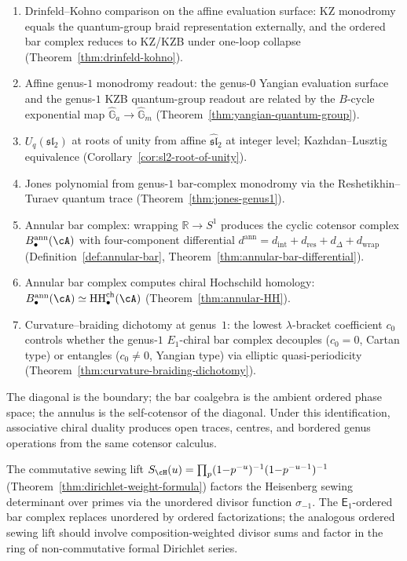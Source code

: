 \begin{enumerate}[label=(\arabic*)]
$B$-cycle monodromy of the KZB connection, with
$q = e^{\pi i\hbar}$
(Theorem~\ref{thm:b-cycle-quantum-group}).
\item Drinfeld--Kohno comparison on the affine evaluation surface: KZ
monodromy equals the quantum-group braid representation externally,
and the ordered bar complex reduces to KZ/KZB under one-loop collapse
(Theorem~\ref{thm:drinfeld-kohno}).
\item Affine genus-$1$ monodromy readout: the genus-$0$ Yangian
evaluation surface and the genus-$1$ KZB quantum-group readout are
related by the $B$-cycle exponential map
$\widehat{\mathbb{G}}_a \to \widehat{\mathbb{G}}_m$
(Theorem~\ref{thm:yangian-quantum-group}).
\item $U_q(\mathfrak{sl}_2)$ at roots of unity from affine
$\widehat{\mathfrak{sl}}_2$ at integer level; Kazhdan--Lusztig equivalence
(Corollary~\ref{cor:sl2-root-of-unity}).
\item Jones polynomial from genus-$1$ bar-complex monodromy via the
Reshetikhin--Turaev quantum trace
(Theorem~\ref{thm:jones-genus1}).
\item Annular bar complex: wrapping $\mathbb{R}\to S^1$ produces the
cyclic cotensor complex $B^{\mathrm{ann}}_\bullet(\cA)$ with four-component
differential $d^{\mathrm{ann}}=d_{\mathrm{int}}+d_{\mathrm{res}}+d_\Delta
+d_{\mathrm{wrap}}$ (Definition~\ref{def:annular-bar},
Theorem~\ref{thm:annular-bar-differential}).
\item Annular bar complex computes chiral Hochschild homology:
$B^{\mathrm{ann}}_\bullet(\cA)\simeq\HH^{\mathrm{ch}}_\bullet(\cA)$
(Theorem~\ref{thm:annular-HH}).
\item Curvature--braiding dichotomy at genus~$1$: the lowest
$\lambda$-bracket coefficient $c_0$ controls whether the genus-$1$
$E_1$-chiral bar complex decouples ($c_0=0$, Cartan type) or entangles
($c_0\ne 0$, Yangian type) via elliptic quasi-periodicity
(Theorem~\ref{thm:curvature-braiding-dichotomy}).
\end{enumerate}

\bigskip

\noindent
The diagonal is the boundary; the bar coalgebra is the ambient ordered
phase space; the annulus is the self-cotensor of the diagonal. Under
this identification, associative chiral duality produces open traces,
centres, and bordered genus operations from the same cotensor
calculus.

\begin{remark}%
\label{rem:e1-noncommutative-euler}%
The commutative sewing lift
$S_\cH(u) = \prod_p(1{-}p^{-u})^{-1}(1{-}p^{-u-1})^{-1}$
(Theorem~\ref{thm:dirichlet-weight-formula})
factors the Heisenberg sewing determinant over primes
via the unordered divisor function $\sigma_{-1}$.
The $\mathsf{E}_1$-ordered bar complex replaces
unordered by ordered factorizations; the analogous
ordered sewing lift should involve composition-weighted
divisor sums and factor in the ring of non-commutative
formal Dirichlet series.
\end{remark}
